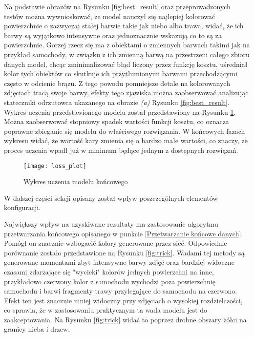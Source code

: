  \noindent
 Na podstawie obrazów na Rysunku \ref{fig:best_result} oraz przeprowadzonych
 testów można wywnioskować, że model nauczył się najlepiej kolorować powierzchnie
 o zazwyczaj stałej barwie takie jak niebo albo trawa, widać, że ich barwy są
 wyjątkowo intensywne oraz jednoznacznie wskazują co to są za powierzchnie.
 Gorzej rzecz się ma z obiektami o zmiennych barwach takimi jak na przykład
 samochody, w związku z ich zmienną barwą na przestrzeni całego zbioru danych
 model, chcąc zminimalizować błąd liczony przez funkcję kosztu, uśredniał kolor
 tych obiektów co skutkuje ich przytłumionymi barwami przechodzącymi często
 w odcienie brązu. Z tego powodu pomniejsze detale na kolorowanych zdjęciach
 tracą swoje barwy, efekty tego zjawiska można zaobserwować analizując
 stateczniki odrzutowca ukazanego na obrazie \textit{(a)} Rysunku \ref{fig:best_result}.
 Wykres uczenia przedstawionego modelu został przedstawiony na Rysunku
 \ref{fig:loss_plot}. Można zaobserwować stopniowy spadek wartości funkcji
 kosztu, co oznacza poprawne zbieganie się modelu do właściwego rozwiązania.
 W końcowych fazach wykresu widać, że wartość kary zmienia się o bardzo
 małe wartości, co znaczy, że proces uczenia wpadł już w minimum będące
 jednym z dostępnych rozwiązań.

 \begin{figure}[h]
  \centering
  \texttt{[image: loss\_plot]}
  \caption[Wykres uczenia modelu końcowego - źródło: Rysunek własny]
  {Wykres uczenia modelu końcowego}
  \label{fig:loss_plot}
 \end{figure}

  \noindent
  W dalszej części sekcji opisany został wpływ poszczególnych elementów konfiguracji.

  Największy wpływ na uzyskiwane rezultaty ma zastosowanie algorytmu przetwarzania
  końcowego opisanego w punkcie \ref{Przetwarzanie końcowe danych}. Pomógł on
  znacznie wzbogacić kolory generowane przez sieć. Odpowiednie porównanie
  zostało przedstawione na Rysunku \ref{fig:trick}. Wadami tej metody są generowane
  momentami zbyt intensywne barwy zdjęć oraz bardziej widoczne czasami
  zdarzające się "wycieki"
  kolorów jednych powierzchni na inne, przykładowo czerwony kolor z samochodu
  wychodzi poza powierzchnię samochodu i barwi fragmenty trawy przylegające do
  samochodu na czerwono. Efekt ten jest znacznie mniej widoczny przy zdjęciach
  o wysokiej rozdzielczości, co sprawia, że w zastosowaniu praktycznym ta
  wada modelu jest do zaakceptowania. Na Rysunku \ref{fig:trick} widać to
  poprzez drobne obszary żółci na granicy nieba i drzew.

